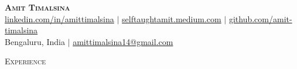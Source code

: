 \documentclass[a4paper]{article}
\newcommand{\lineunder} {
    \vspace*{-8pt} \\
    \hspace*{-18pt} \hrulefill \\
}
\newcommand{\header} [1] {
    {\hspace*{-18pt}\vspace*{6pt} \textsc{#1}}
    \vspace*{-6pt} \lineunder
}
\begin{document}
\vspace*{-40pt}

    

\vspace*{-10pt}
\begin{center}
	\textbf{\Huge \scshape {Amit Timalsina}} \\ \vspace{3pt}
    \small
    \href{https://www.linkedin.com/in/arasgungore}{linkedin.com/in/amittimalsina}
    $|$
    \href{https://selftaughtamit.medium.com/}{selftaughtamit.medium.com}
    $|$
    \href{https://github.com/amit-timalsina}{github.com/amit-timalsina} \\
	{Bengaluru, India}
    $|$
    \href{mailto:amittimlasina14@gmail.com}{amittimalsina14@gmail.com} \\
\end{center}

\header{Experience}
\vspace{1mm}
\end{document}
